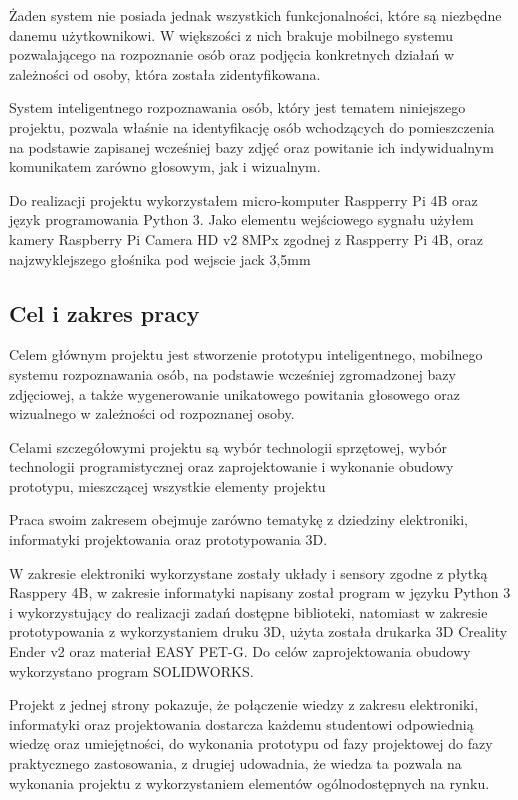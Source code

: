 \documentclass[a4paper,12pt,reqno]{article}
\begin{document}
Żaden system nie posiada jednak wszystkich funkcjonalności, które są niezbędne danemu użytkownikowi. W większości z nich brakuje mobilnego systemu pozwalającego na rozpoznanie osób oraz podjęcia konkretnych działań w zależności od osoby, która została zidentyfikowana.

System inteligentnego rozpoznawania osób, który jest tematem niniejszego projektu, pozwala właśnie na identyfikację osób wchodzących do pomieszczenia na podstawie zapisanej wcześniej bazy zdjęć oraz powitanie ich indywidualnym komunikatem zarówno głosowym, jak i wizualnym.

Do realizacji projektu wykorzystałem micro-komputer Raspperry Pi 4B oraz język programowania Python 3. Jako elementu wejściowego sygnału użyłem kamery Raspberry Pi Camera HD v2 8MPx zgodnej z Raspperry Pi 4B, oraz najzwyklejszego głośnika pod wejscie jack 3,5mm

\subsection{Cel i zakres pracy}

Celem głównym projektu jest stworzenie prototypu inteligentnego, mobilnego systemu rozpoznawania osób, na podstawie wcześniej zgromadzonej bazy zdjęciowej, a także wygenerowanie unikatowego powitania głosowego oraz wizualnego w zależności od rozpoznanej osoby.

Celami szczegółowymi projektu są wybór technologii sprzętowej, wybór technologii programistycznej oraz zaprojektowanie i wykonanie obudowy prototypu, mieszczącej wszystkie elementy projektu

Praca swoim zakresem obejmuje zarówno tematykę z dziedziny elektroniki, informatyki projektowania oraz prototypowania 3D.

W zakresie elektroniki wykorzystane zostały układy i sensory zgodne z płytką Rasppery 4B, w zakresie informatyki napisany został program w języku Python 3 i wykorzystujący do realizacji zadań dostępne biblioteki, natomiast w zakresie prototypowania z wykorzystaniem druku 3D, użyta została drukarka 3D Creality Ender v2 oraz materiał EASY PET-G. Do celów zaprojektowania obudowy wykorzystano program SOLIDWORKS.

Projekt z jednej strony pokazuje, że połączenie wiedzy z zakresu elektroniki, informatyki oraz projektowania dostarcza każdemu studentowi odpowiednią wiedzę oraz umiejętności, do wykonania prototypu od fazy projektowej do fazy praktycznego zastosowania,  z drugiej udowadnia, że wiedza ta pozwala na wykonania projektu z wykorzystaniem elementów ogólnodostępnych na rynku.
\end{document}
